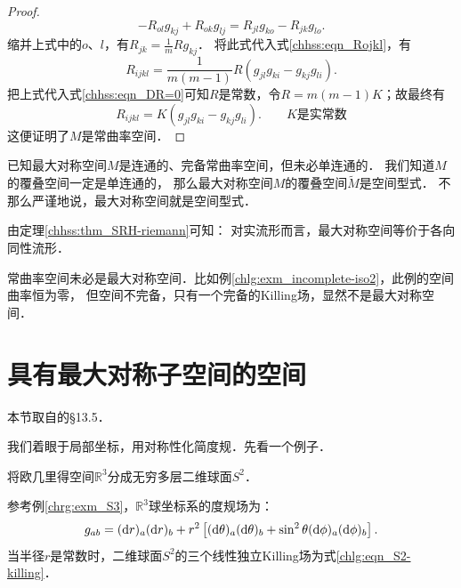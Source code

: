 \begin{proof}
    \begin{equation}
        -R_{ol} g_{kj} + R_{ok} g_{lj} = R_{jl} g_{ko}   - R_{jk} g_{lo} .
    \end{equation}
    缩并上式中的$o$、$l$，有$   R_{jk} = \frac{1}{m} R g_{kj} $．
    将此式代入式\eqref{chhss:eqn_Rojkl}，有
    \begin{equation}
        R_{ijkl} = \frac{1}{m(m-1)} R (g_{jl}  g_{ki}   -  g_{kj} g_{li}) .
    \end{equation}
    把上式代入式\eqref{chhss:eqn_DR=0}可知$R$是常数，令$R= m(m-1)K$；故最终有
    \begin{equation}
        R_{ijkl} = K  (g_{jl}  g_{ki}   -  g_{kj} g_{li}) .
        \qquad K\text{是实常数}
    \end{equation}
    这便证明了$M$是常曲率空间．
\end{proof}


已知最大对称空间$M$是连通的、完备常曲率空间，但未必单连通的．
我们知道$M$的覆叠空间一定是单连通的，
那么最大对称空间$M$的覆叠空间$\widetilde{M}$是空间型式．
不那么严谨地说，最大对称空间就是空间型式．


由定理\ref{chhss:thm_SRH-riemann}可知：
对实流形而言，最大对称空间{\kaishu 等价于}各向同性流形．

常曲率空间未必是最大对称空间．比如例\ref{chlg:exm_incomplete-iso2}，此例的空间曲率恒为零，
但空间不完备，只有一个完备的Killing场，显然不是最大对称空间．





\section{具有最大对称子空间的空间}\label{chhss:sec_maxsymss}

本节取自\parencite{weinberg_grav-1972}的\S 13.5．

我们着眼于局部坐标，用对称性化简度规．先看一个例子．


\begin{example}\label{chhss:exm_sphere}
    将欧几里得空间$\mathbb{R}^3$分成无穷多层二维球面$S^2$．
\end{example}
参考例\ref{chrg:exm_S3}，$\mathbb{R}^3$球坐标系的度规场为：
\begin{equation}
    g_{ab}= ({\rm d}r)_a ({\rm d}r)_b 
    +r^2 \left[({\rm d}\theta)_a ({\rm d}\theta)_b
    +\sin^2\theta ({\rm d}\phi)_a ({\rm d}\phi)_b \right].
\end{equation}
当半径$r$是常数时，二维球面$S^2$的三个线性独立Killing场为式\eqref{chlg:eqn_S2-killing}．

